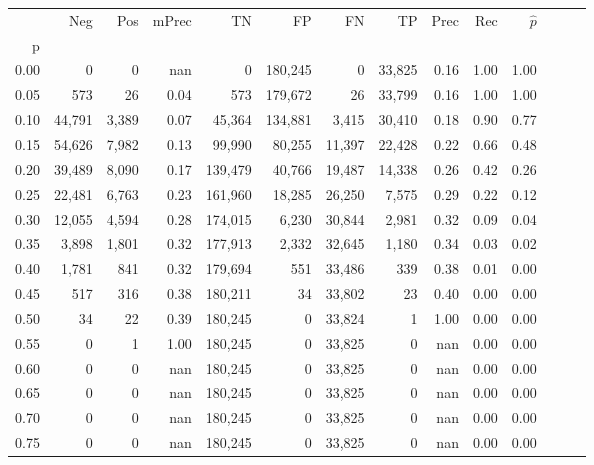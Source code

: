 \begin{tabular}{rrrrrrrrrrrrrr}
\toprule
{} &     Neg &    Pos & mPrec &       TN &       FP &      FN &      TP &  Prec &   Rec & $\hat{p}$ \\
p    &         &        &       &          &          &         &         &       &       &           \\
\midrule
0.00 &       0 &      0 &   nan &        0 &  180,245 &       0 &  33,825 &  0.16 &  1.00 &      1.00 \\
0.05 &     573 &     26 &  0.04 &      573 &  179,672 &      26 &  33,799 &  0.16 &  1.00 &      1.00 \\
0.10 &  44,791 &  3,389 &  0.07 &   45,364 &  134,881 &   3,415 &  30,410 &  0.18 &  0.90 &      0.77 \\
0.15 &  54,626 &  7,982 &  0.13 &   99,990 &   80,255 &  11,397 &  22,428 &  0.22 &  0.66 &      0.48 \\
0.20 &  39,489 &  8,090 &  0.17 &  139,479 &   40,766 &  19,487 &  14,338 &  0.26 &  0.42 &      0.26 \\
0.25 &  22,481 &  6,763 &  0.23 &  161,960 &   18,285 &  26,250 &   7,575 &  0.29 &  0.22 &      0.12 \\
0.30 &  12,055 &  4,594 &  0.28 &  174,015 &    6,230 &  30,844 &   2,981 &  0.32 &  0.09 &      0.04 \\
0.35 &   3,898 &  1,801 &  0.32 &  177,913 &    2,332 &  32,645 &   1,180 &  0.34 &  0.03 &      0.02 \\
0.40 &   1,781 &    841 &  0.32 &  179,694 &      551 &  33,486 &     339 &  0.38 &  0.01 &      0.00 \\
0.45 &     517 &    316 &  0.38 &  180,211 &       34 &  33,802 &      23 &  0.40 &  0.00 &      0.00 \\
0.50 &      34 &     22 &  0.39 &  180,245 &        0 &  33,824 &       1 &  1.00 &  0.00 &      0.00 \\
0.55 &       0 &      1 &  1.00 &  180,245 &        0 &  33,825 &       0 &   nan &  0.00 &      0.00 \\
0.60 &       0 &      0 &   nan &  180,245 &        0 &  33,825 &       0 &   nan &  0.00 &      0.00 \\
0.65 &       0 &      0 &   nan &  180,245 &        0 &  33,825 &       0 &   nan &  0.00 &      0.00 \\
0.70 &       0 &      0 &   nan &  180,245 &        0 &  33,825 &       0 &   nan &  0.00 &      0.00 \\
0.75 &       0 &      0 &   nan &  180,245 &        0 &  33,825 &       0 &   nan &  0.00 &      0.00 \\

\end{tabular}
